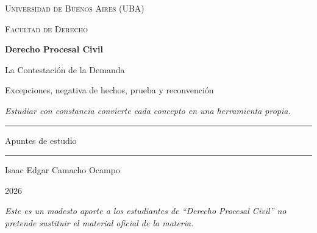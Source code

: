 \documentclass[12pt,oneside]{book}
\newcommand{\universidad}{Universidad de Buenos Aires (UBA)}
\newcommand{\facultad}{Facultad de Derecho}
\newcommand{\materia}{Derecho Procesal Civil}
\newcommand{\titulo}{La Contestación de la Demanda}
\newcommand{\subtitulo}{Excepciones, negativa de hechos, prueba y reconvención}
\newcommand{\autor}{Isaac Edgar Camacho Ocampo}
\newcommand{\anio}{2026}
\begin{document}
\begin{titlepage}

\thispagestyle{empty}

\begin{center}

\vspace*{1cm}

{\large \textsc{\universidad}}

\vspace{0.2cm}

{\large \textsc{\facultad}}

\vspace{3cm}

{\Huge \textbf{\materia}}

\vspace{1cm}

{\LARGE \titulo}

\vspace{0.4cm}

{\large \subtitulo}

\vspace{0.8cm}

\textit{Estudiar con constancia convierte cada concepto en una herramienta propia.}

\vspace{1.2cm}

\rule{0.70\textwidth}{0.5pt}

\vspace{0.5cm}

{\large Apuntes de estudio}

\vspace{0.5cm}

\rule{0.70\textwidth}{0.5pt}

\vfill

{\large \autor}

\vspace{0.3cm}

{\large \anio}

\end{center}

\vfill

\begin{flushleft}
\textit{Este es un modesto aporte a los estudiantes de ``Derecho Procesal Civil'' no pretende sustituir el material oficial de la materia.}
\end{flushleft}

\end{titlepage}
\end{document}
